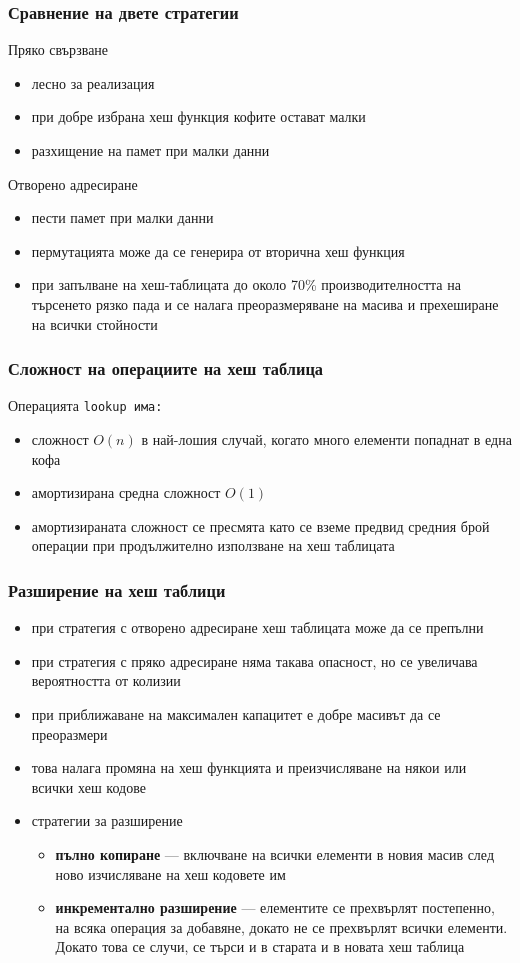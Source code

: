 \documentclass[alsotrans,beameroptions={aspectratio=169}]{beamerswitch}
\begin{document}
\begin{frame}
  \frametitle{Сравнение на двете стратегии}
  Пряко свързване
  \begin{itemize}[<+->]
  \item лесно за реализация
  \item при добре избрана хеш функция кофите остават малки
  \item разхищение на памет при малки данни
  \end{itemize}
  \onslide<+->
  Отворено адресиране
  \begin{itemize}[<+->]
  \item пести памет при малки данни
  \item пермутацията може да се генерира от вторична хеш функция
  \item при запълване на хеш-таблицата до около 70\% производителността на търсенето рязко пада и се налага преоразмеряване на масива и прехеширане на всички стойности
  \end{itemize}
\end{frame}

\begin{frame}
  \frametitle{Сложност на операциите на хеш таблица}
  Операцията \tt{lookup} има:
  \begin{itemize}[<+->]
  \item сложност $O(n)$ в най-лошия случай, когато много елементи попаднат в една кофа
  \item \alert{амортизирана средна сложност $O(1)$}
  \item амортизираната сложност се пресмята като се вземе предвид средния брой операции при продължително използване на хеш таблицата
  \end{itemize}
\end{frame}

\begin{frame}
  \frametitle{Разширение на хеш таблици}
  \begin{itemize}[<+->]
  \item при стратегия с отворено адресиране хеш таблицата може да се препълни
  \item при стратегия с пряко адресиране няма такава опасност, но се увеличава вероятността от колизии
  \item при приближаване на максимален капацитет е добре масивът да се преоразмери
  \item това налага промяна на хеш функцията и преизчисляване на някои или всички хеш кодове
  \item стратегии за разширение
    \begin{itemize}
    \item \textbf{пълно копиране} --- включване на всички елементи в новия масив след ново изчисляване на хеш кодовете им
    \item \textbf{инкрементално разширение} --- елементите се прехвърлят постепенно, на всяка операция за добавяне, докато не се прехвърлят всички елементи. Докато това се случи, се търси и в старата и в новата хеш таблица
    \end{itemize}
  \end{itemize}
\end{frame}
\end{document}
